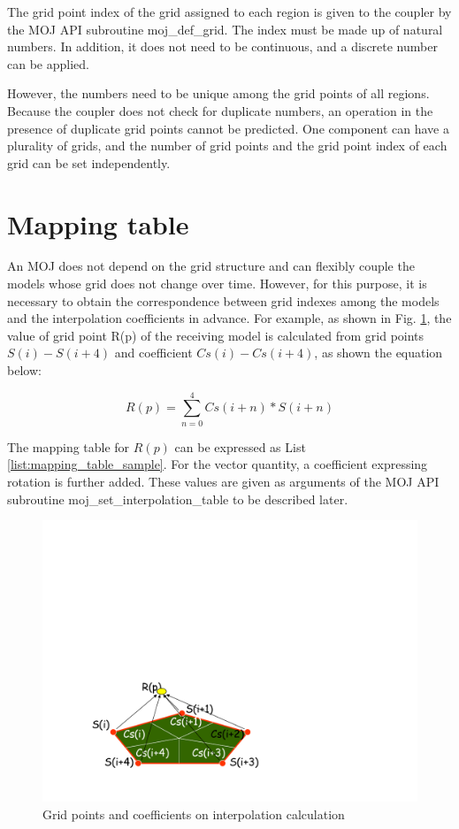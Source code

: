 \documentclass[11pt,a4paper]{report}
\newcommand{\figref}[1]{Fig. \ref{#1}}
\newcommand{\lstref}[1]{List \ref{#1}}
\begin{document}
The grid point index of the grid assigned to each region is given to the coupler by the MOJ API subroutine moj\_def\_grid.
The index must be made up of natural numbers. In addition, it does not need to be continuous, and a discrete number can be applied.

However, the numbers need to be unique among the grid points of all regions.
Because the coupler does not check for duplicate numbers, an operation in the presence of duplicate grid points cannot be predicted.
One component can have a plurality of grids, and the number of grid points and the grid point index of each grid can be set independently.


\section{Mapping table}
An MOJ does not depend on the grid structure and can flexibly couple the models whose grid does not change over time.
However, for this purpose, it is necessary to obtain the correspondence between grid indexes among the models and the interpolation coefficients in advance.
For example, as shown in \figref{fig:interpolation_image}, the value of grid point R(p) of the receiving model is calculated from grid points $S(i)-S(i+4)$ and coefficient $Cs(i)-Cs(i+4)$, as shown the equation below:

\begin{equation}
R(p) = \sum_{n=0}^{4} Cs(i+n)*S(i+n)
\end{equation}

The mapping table for $R(p)$ can be expressed as \lstref{list:mapping_table_sample}. 
For the vector quantity, a coefficient expressing rotation is further added. 
These values are given as arguments of the MOJ API subroutine moj\_set\_interpolation\_table to be described later.


\begin{figure}[H]
\begin{center}
\includegraphics[bb = 0 0 500 250, scale=0.6, clip]{figs/interpolation_image.pdf}
\caption{Grid points and coefficients on interpolation calculation}
\label{fig:interpolation_image}
\end{center}
\end{figure}
\end{document}
